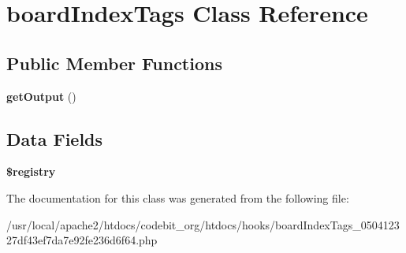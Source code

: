 \hypertarget{classboard_index_tags}{\section{board\-Index\-Tags Class Reference}
\label{classboard_index_tags}
}
\subsection*{Public Member Functions}
\begin{DoxyCompactItemize}
\item 
\hypertarget{classboard_index_tags_aefad4c11248b7c6fa6581c25d82bf9c6}{{\bfseries get\-Output} ()}\label{classboard_index_tags_aefad4c11248b7c6fa6581c25d82bf9c6}

\end{DoxyCompactItemize}
\subsection*{Data Fields}
\begin{DoxyCompactItemize}
\item 
\hypertarget{classboard_index_tags_a531e4a386aaa7f3e06d3642dc38d7e80}{{\bfseries \$registry}}\label{classboard_index_tags_a531e4a386aaa7f3e06d3642dc38d7e80}

\end{DoxyCompactItemize}


The documentation for this class was generated from the following file\-:\begin{DoxyCompactItemize}
\item 
/usr/local/apache2/htdocs/codebit\-\_\-org/htdocs/hooks/board\-Index\-Tags\-\_\-050412327df43ef7da7e92fe236d6f64.\-php\end{DoxyCompactItemize}
